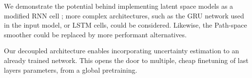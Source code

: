 \documentclass[conference]{IEEEtran}
\begin{document}
We demonstrate the potential behind implementing latent space models as a modified RNN cell ;
more complex architectures, such as the GRU network used in the input model, or LSTM cells, could be considered.
Likewise, the Path-space smoother could be replaced by more performant alternatives.

Our decoupled architecture enables incorporating uncertainty estimation to an already trained network.
This opens the door to multiple, cheap finetuning of last layers parameters, from a global pretraining.

\clearpage


\end{document}

